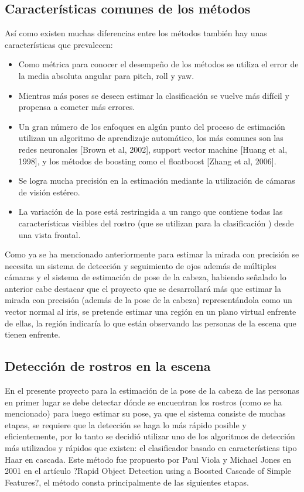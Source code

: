\subsection{Características comunes de los métodos}
Así como existen muchas diferencias entre los métodos también hay unas características que prevalecen:
\begin{itemize}
	\item Como métrica para conocer el desempeño de los métodos se utiliza el error de la media absoluta angular para pitch, roll y yaw.
	\item Mientras más poses se deseen estimar la clasificación se vuelve más difícil y propensa a cometer más errores.
	\item Un gran número de los enfoques en algún punto del proceso de estimación utilizan un algoritmo de aprendizaje automático, los más comunes son las redes neuronales [Brown et al, 2002], support vector machine [Huang et al, 1998], y los métodos de boosting como el floatboost [Zhang et al, 2006].
	\item Se logra mucha precisión en la estimación mediante la utilización de cámaras de visión estéreo.
	\item La variación de la pose está restringida a un rango que contiene todas las características visibles del rostro (que se utilizan para la clasificación ) desde una vista frontal.
\end{itemize}

   Como ya se ha mencionado anteriormente para estimar la mirada con precisión se necesita un sistema de detección y seguimiento de ojos además de múltiples cámaras y el sistema de estimación de pose de la cabeza, habiendo señalado lo anterior cabe destacar que el proyecto que se desarrollará más que estimar la mirada con precisión (además de la pose de la cabeza) representándola como un vector normal al iris,  se pretende estimar una región en un plano virtual enfrente de ellas, la región indicaría lo que están observando las personas de la escena que tienen enfrente. 
   
   \subsection{Detección de rostros en la escena}
   En el presente proyecto para la estimación de la pose de la cabeza de las personas en primer lugar se debe detectar dónde se encuentran los rostros (como se ha mencionado) para luego estimar su pose, ya que el sistema consiste de muchas etapas, se requiere que la detección se haga lo más rápido posible y eficientemente,  por lo tanto se decidió utilizar uno de los algoritmos de detección más utilizados y rápidos que existen: el clasificador basado en características tipo Haar en cascada. Este método fue propuesto por Paul Viola y Michael Jones en 2001 en el artículo ?Rapid Object Detection using a Boosted Cascade of Simple Features?, el método consta principalmente de las siguientes etapas.
   
